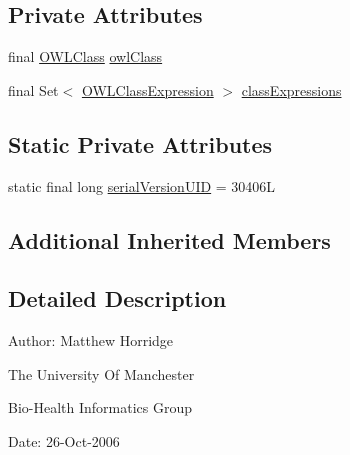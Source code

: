 \subsection*{Private Attributes}
\begin{DoxyCompactItemize}
\item 
final \hyperlink{interfaceorg_1_1semanticweb_1_1owlapi_1_1model_1_1_o_w_l_class}{O\-W\-L\-Class} \hyperlink{classuk_1_1ac_1_1manchester_1_1cs_1_1owl_1_1owlapi_1_1_o_w_l_disjoint_union_axiom_impl_aa05e7c20893afc492e3433b47d7c2b3f}{owl\-Class}
\item 
final Set$<$ \hyperlink{interfaceorg_1_1semanticweb_1_1owlapi_1_1model_1_1_o_w_l_class_expression}{O\-W\-L\-Class\-Expression} $>$ \hyperlink{classuk_1_1ac_1_1manchester_1_1cs_1_1owl_1_1owlapi_1_1_o_w_l_disjoint_union_axiom_impl_a49e1c4de2ba4a315e0d585ca0c8ce863}{class\-Expressions}
\end{DoxyCompactItemize}
\subsection*{Static Private Attributes}
\begin{DoxyCompactItemize}
\item 
static final long \hyperlink{classuk_1_1ac_1_1manchester_1_1cs_1_1owl_1_1owlapi_1_1_o_w_l_disjoint_union_axiom_impl_a232b20b1d3e30e17dbc8eaa9c7c1a962}{serial\-Version\-U\-I\-D} = 30406\-L
\end{DoxyCompactItemize}
\subsection*{Additional Inherited Members}


\subsection{Detailed Description}
Author\-: Matthew Horridge\par
 The University Of Manchester\par
 Bio-\/\-Health Informatics Group\par
 Date\-: 26-\/\-Oct-\/2006\par
\par
 

